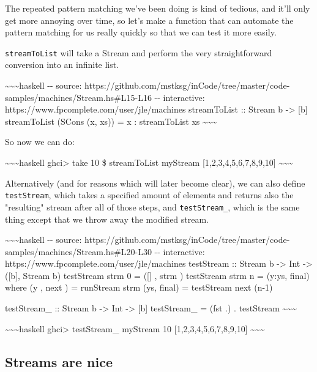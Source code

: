 \documentclass[]{article}
\begin{document}
The repeated pattern matching we've been doing is kind of tedious, and it'll
only get more annoying over time, so let's make a function that can automate the
pattern matching for us really quickly so that we can test it more easily.

\texttt{streamToList} will take a Stream and perform the very straightforward
conversion into an infinite list.

\textasciitilde{}\textasciitilde{}\textasciitilde{}haskell -\/- source:
https://github.com/mstksg/inCode/tree/master/code-samples/machines/Stream.hs\#L15-L16
-\/- interactive: https://www.fpcomplete.com/user/jle/machines streamToList ::
Stream b -\textgreater{} {[}b{]} streamToList (SCons (x, xs)) = x : streamToList
xs \textasciitilde{}\textasciitilde{}\textasciitilde{}

So now we can do:

\textasciitilde{}\textasciitilde{}\textasciitilde{}haskell ghci\textgreater{}
take 10 \$ streamToList myStream {[}1,2,3,4,5,6,7,8,9,10{]}
\textasciitilde{}\textasciitilde{}\textasciitilde{}

Alternatively (and for reasons which will later become clear), we can also
define \texttt{testStream}, which takes a specified amount of elements and
returns also the "resulting" stream after all of those steps, and
\texttt{testStream\_}, which is the same thing except that we throw away the
modified stream.

\textasciitilde{}\textasciitilde{}\textasciitilde{}haskell -\/- source:
https://github.com/mstksg/inCode/tree/master/code-samples/machines/Stream.hs\#L20-L30
-\/- interactive: https://www.fpcomplete.com/user/jle/machines testStream ::
Stream b -\textgreater{} Int -\textgreater{} ({[}b{]}, Stream b) testStream strm
0 = ({[}{]} , strm ) testStream strm n = (y:ys, final) where (y , next ) =
runStream strm (ys, final) = testStream next (n-1)

testStream\_ :: Stream b -\textgreater{} Int -\textgreater{} {[}b{]}
testStream\_ = (fst .) . testStream
\textasciitilde{}\textasciitilde{}\textasciitilde{}

\textasciitilde{}\textasciitilde{}\textasciitilde{}haskell ghci\textgreater{}
testStream\_ myStream 10 {[}1,2,3,4,5,6,7,8,9,10{]}
\textasciitilde{}\textasciitilde{}\textasciitilde{}

\subsection{Streams are nice}
\end{document}
